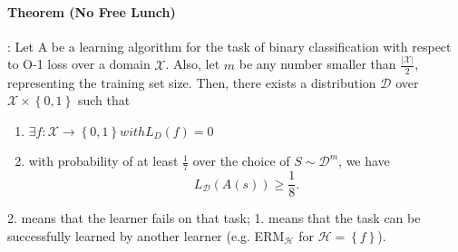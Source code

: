\documentclass[10pt,a4paper]{article}
\theoremstyle{definition}
\theoremstyle{plain}
\begin{document}
\paragraph{Theorem (No Free Lunch)}:
Let A be a learning algorithm for the task of binary classification with respect to O-1 loss over a domain $\mathcal{X}$. Also, let $m$ be any number smaller than ${\frac{|\mathcal{X}|}{2}}$, representing the training set size. Then, there exists a distribution $\mathcal{D}$ over $\mathcal{X} \times \left\{0, 1\right\}$ such that
\begin{enumerate}
	\item $\exists f: \mathcal{X} \to \left\{0,1\right\} with L_D(f) = 0$
	 \item with probability of at least $\frac{1}{7}$ over the choice of $S \sim \mathcal{D}^m$, we have\\
	 $$ L_\mathcal{D}\left(A(s)\right) \geq \frac{1}{8}.$$
\end{enumerate}
2. means that the learner fails on that task; 1. means that the task can be successfully learned by another learner (e.g. ERM$_{\mathcal{H}}$ for $\mathcal{H} = \left\{f\right\}$).
\end{document}

